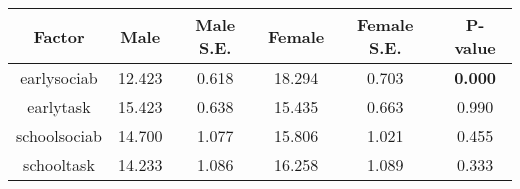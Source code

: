 \begin{longtable}{c c c c c c}
\toprule
\textbf{Factor} & \textbf{Male} & \textbf{Male S.E.}  & \textbf{Female} & \textbf{Female S.E.} & \textbf{P-value} \\
\midrule
earlysociab & 12.423 & 0.618 &  18.294 & 0.703 & \textbf{0.000} \\
earlytask & 15.423 & 0.638 &  15.435 & 0.663 & 0.990 \\
schoolsociab & 14.700 & 1.077 &  15.806 & 1.021 & 0.455 \\
schooltask & 14.233 & 1.086 &  16.258 & 1.089 & 0.333 \\
\bottomrule
\end{longtable}
